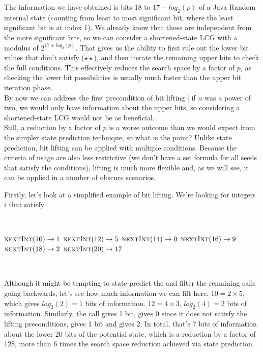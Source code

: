 \documentclass{article}
\begin{document}
The information we have obtained is bits 18 to $17 + log_2(p)$ of a Java Random internal state (counting from least to most significant bit, where the least significant bit is at index 1). We already know that those are independent from the more significant bits, so we can consider a shortened-state LCG with a modulus of $2^{17+log_2(p)}$. That gives us the ability to first rule out the lower bit values that don’t satisfy ($\star \star$), and then iterate the remaining upper bits to check the full conditions. This effectively reduces the search space by a factor of $p$, as checking the lower bit possibilities is usually much faster than the upper bit iteration phase. \\
By now we can address the first precondition of bit lifting | if $n$ was a power of two, we would only have information about the upper bits, so considering a shortened-state LCG would not be as beneficial. \\
Still, a reduction by a factor of $p$ is a worse outcome than we would expect from the simpler state prediction technique, so what is the point? Unlike state prediction, bit lifting can be applied with multiple conditions. Because the criteria of usage are also less restrictive (we don’t have a set formula for all seeds that satisfy the conditions), lifting is much more flexible and, as we will see, it can be applied in a number of obscure scenarios. 

Firstly, let’s look at a simplified example of bit lifting. We’re looking for integers $i$ that satisfy

\
\begin{algorithmic}
\State {}
\State $\Call{nextInt}{10} \to 1$
\State $\Call{nextInt}{12} \to 5$
\State $\Call{nextInt}{14} \to 0$
\State $\Call{nextInt}{16} \to 9$
\State $\Call{nextInt}{18} \to 2$
\State $\Call{nextInt}{20} \to 17$
\end{algorithmic}
\ \

Although it might be tempting to state-predict the  and filter the remaining calls going backwards, let’s see how much information we can lift here. $10 = 2 \times 5$, which gives $log_2(2) = 1$ bits of information. $12 = 4 \times 3$, $log_2(4) = 2$ bits of information. Similarly, the  call gives 1 bit,  gives 0 since it does not satisfy the lifting preconditions,  gives 1 bit and  gives 2. In total, that’s 7 bits of information about the lower 20 bits of the potential state, which is a reduction by a factor of 128, more than 6 times the search space reduction achieved via state prediction. %
\end{document}
